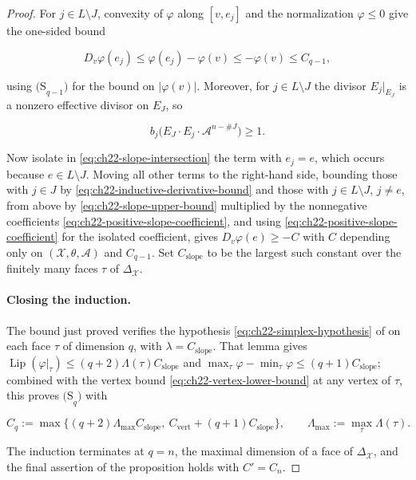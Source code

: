 \begin{proof}
For \(j\in L\setminus J\), convexity of \(\varphi\) along \([v,e_j]\) and
the normalization \(\varphi\leq0\) give the one-sided bound

\[
             D_v\varphi(e_j)
             \leq\varphi(e_j)-\varphi(v)\leq-\varphi(v)\leq C_{q-1},
\tag{22.49}\label{eq:ch22-slope-upper-bound}
\]

using \(\mathrm{(S}_{q-1}\mathrm{)}\) for the bound on \(|\varphi(v)|\).
Moreover, for \(j\in L\setminus J\) the divisor \(E_j|_{E_J}\) is a nonzero
effective divisor on \(E_J\), so

\[
 b_j\bigl(E_J\cdot E_j\cdot\mathcal A^{n-\#J}\bigr)\geq1 .
\tag{22.50}\label{eq:ch22-positive-slope-coefficient}
\]

Now isolate in \eqref{eq:ch22-slope-intersection} the term with
\(e_j=e\), which occurs because \(e\in L\setminus J\).  Moving all other
terms to the right-hand side, bounding those with \(j\in J\) by
\eqref{eq:ch22-inductive-derivative-bound} and those with
\(j\in L\setminus J\), \(j\neq e\), from above by
\eqref{eq:ch22-slope-upper-bound} multiplied by the nonnegative coefficients
\eqref{eq:ch22-positive-slope-coefficient}, and using
\eqref{eq:ch22-positive-slope-coefficient} for the isolated coefficient,
gives \(D_v\varphi(e)\geq-C\) with \(C\) depending only on
\((\mathcal X,\theta,\mathcal A)\) and \(C_{q-1}\).  Set
\(C_{\mathrm{slope}}\) to be the largest such constant over the finitely
many faces \(\tau\) of \(\Delta_{\mathcal X}\).

\paragraph{Closing the induction.}
The bound just proved verifies the hypothesis
\eqref{eq:ch22-simplex-hypothesis} of  on each face
\(\tau\) of dimension \(q\), with \(\lambda=C_{\mathrm{slope}}\).  That
lemma gives
\(\operatorname{Lip}(\varphi|_\tau)\leq(q+2)\Lambda(\tau)C_{\mathrm{slope}}\)
and \(\max_\tau\varphi-\min_\tau\varphi\leq(q+1)C_{\mathrm{slope}}\);
combined with the vertex bound \eqref{eq:ch22-vertex-lower-bound} at any
vertex of \(\tau\), this proves \(\mathrm{(S}_q\mathrm{)}\) with

\[
 C_q:=\max\bigl\{(q+2)\Lambda_{\max}C_{\mathrm{slope}},\
       C_{\mathrm{vert}}+(q+1)C_{\mathrm{slope}}\bigr\},
 \qquad
 \Lambda_{\max}:=\max_\tau\Lambda(\tau).
\tag{22.51}\label{eq:ch22-inductive-constant}
\]

The induction terminates at \(q=n\), the maximal dimension of a face of
\(\Delta_{\mathcal X}\), and the final assertion of the proposition holds
with \(C'=C_n\).
\end{proof}

